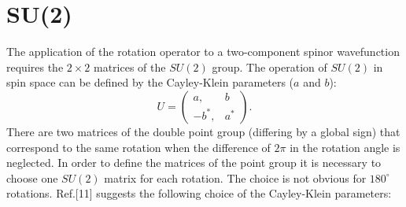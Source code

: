 \documentclass[12pt,a4paper,twoside]{report}
\begin{document}
{\color{coral}\section{SU(2)}}
\color{black}
The application of the rotation operator to a two-component spinor 
wavefunction requires the $2\times2$ matrices of the $SU(2)$ group.
The operation of $SU(2)$ in spin space can be defined by the Cayley-Klein
parameters ($a$ and $b$):
\begin{equation}
U=\left( \begin{array}{cc}
a, & b
\\
-b^*, & a^*
\end{array}
\right).
\nonumber
\end{equation}
There are two matrices of the double point group (differing by a global
sign) that correspond to the same rotation when the difference of $2\pi$ in
the rotation angle is neglected. In order to define the
matrices of the point group it is necessary to choose one $SU(2)$ matrix
for each rotation. The choice is not obvious for $180^\circ$ rotations.
Ref.[11] suggests the following choice of the Cayley-Klein parameters: 
\end{document}
